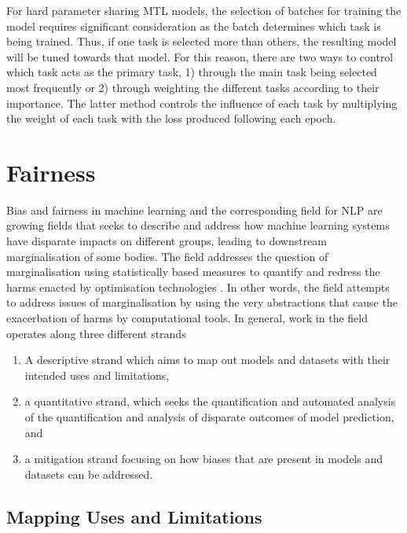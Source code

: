 For hard parameter sharing MTL models, the selection of batches for training the model requires significant consideration as the batch determines which task is being trained. Thus, if one task is selected more than others, the resulting model will be tuned towards that model.
For this reason, there are two ways to control which task acts as the primary task, 1) through the main task being selected most frequently or 2) through weighting the different tasks according to their importance.
The latter method controls the influence of each task by multiplying the weight of each task with the loss produced following each epoch.

\section{Fairness}\label{sec:fairlitt}

Bias and fairness in machine learning and the corresponding field for NLP are growing fields that seeks to describe and address how machine learning systems have disparate impacts on different groups, leading to downstream marginalisation of some bodies.
The field addresses the question of marginalisation using statistically based measures to quantify and redress the harms enacted by optimisation technologies \citep{Kulynych:2020}.
In other words, the field attempts to address issues of marginalisation by using the very abstractions that cause the exacerbation of harms by computational tools.
In general, work in the field operates along three different strands

\begin{enumerate}
  \item{A descriptive strand which aims to map out models and datasets with their intended uses and limitations,}
  \item{a quantitative strand, which seeks the quantification and automated analysis of the quantification and analysis of disparate outcomes of model prediction, and}
  \item{a mitigation strand focusing on how biases that are present in models and datasets can be addressed.}
\end{enumerate}

\subsection{Mapping Uses and Limitations}

